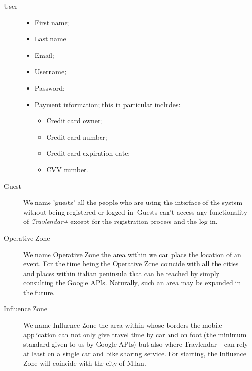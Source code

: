 \begin{description}
				\item[User] 
				\begin{itemize}
					\item First name;
					\item Last name; 
					\item Email;
					\item Username;
					\item Password;
					\item Payment information; this in particular includes:
						\begin{itemize}
							\item Credit card owner;
							\item Credit card number;
							\item Credit card expiration date;
							\item CVV number.
						\end{itemize}
				\end{itemize}
				
				\item[Guest] We name 'guests' all the people who are using the interface of the system without being registered or logged in. Guests can't access any functionality of \textit{Travlendar+} except for the registration process and the log in. 
				\item[Operative Zone] We name Operative Zone the area within we can place the location of an event. For the time being the Operative Zone coincide with all the cities and places within italian peninsula that can be reached by simply consulting the Google APIs. Naturally, such an area may be expanded in the future.
				\item[Influence Zone] We name Influence Zone the area within whose borders the mobile application can not only give travel time by car and on foot (the minimum standard given to us by Google APIs) but also where Travlendar+ can rely at least on a single car and bike sharing service. For starting, the Influence Zone will coincide with the city of Milan.
				

\end{description}
